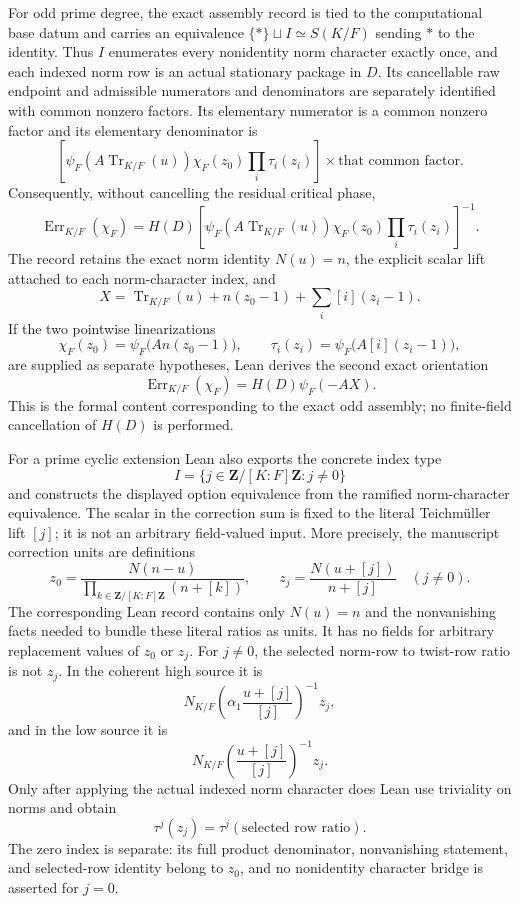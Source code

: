 \begin{definition}
For odd prime degree, the exact assembly record is tied to the computational
base datum and carries an equivalence
$\{\ast\}\sqcup I\simeq S(K/F)$ sending $\ast$ to the identity.  Thus $I$
enumerates every nonidentity norm character exactly once, and each indexed
norm row is an actual stationary package in $D$.  Its cancellable raw
endpoint and admissible numerators and denominators are separately identified
with common nonzero factors.  Its elementary numerator is a common nonzero
factor and its elementary denominator is
\[
 \left[
  \psi_F\!\left(A\operatorname{Tr}_{K/F}(u)\right)
  \chi_F(z_0)\prod_i\tau_i(z_i)
 \right]
 \times\text{that common factor}.
\]
Consequently, without cancelling the residual critical phase,
\[
 \operatorname{Err}_{K/F}(\chi_F)
 =H(D)
 \left[
  \psi_F\!\left(A\operatorname{Tr}_{K/F}(u)\right)
  \chi_F(z_0)\prod_i\tau_i(z_i)
 \right]^{-1}.
\]
The record retains the exact norm identity $N(u)=n$, the explicit scalar
lift attached to each norm-character index, and
\[
 X=\operatorname{Tr}_{K/F}(u)+n(z_0-1)
      +\sum_i [i](z_i-1).
\]
If the two pointwise linearizations
\[
 \chi_F(z_0)=\psi_F\bigl(An(z_0-1)\bigr),
 \qquad
 \tau_i(z_i)=\psi_F\bigl(A[i](z_i-1)\bigr),
\]
are supplied as separate hypotheses, Lean derives the second exact
orientation
\[
 \operatorname{Err}_{K/F}(\chi_F)=H(D)\psi_F(-AX).
\]
This is the formal content corresponding to the exact odd assembly; no
finite-field cancellation of $H(D)$ is performed.

For a prime cyclic extension Lean also exports the concrete index type
\[
 I=\{j\in\mathbf Z/[K:F]\mathbf Z:j\ne0\}
\]
and constructs the displayed option equivalence from the ramified
norm-character equivalence.  The scalar in the correction sum is fixed to
the literal Teichm\"uller lift $[j]$; it is not an arbitrary field-valued
input.  More precisely, the manuscript correction units are definitions
\[
 z_0=\frac{N(n-u)}{\prod_{k\in\mathbf Z/[K:F]\mathbf Z}(n+[k])},
 \qquad
 z_j=\frac{N(u+[j])}{n+[j]}\quad(j\ne0).
\]
The corresponding Lean record contains only $N(u)=n$ and the nonvanishing
facts needed to bundle these literal ratios as units.  It has no fields for
arbitrary replacement values of $z_0$ or $z_j$.  For $j\ne0$, the selected
norm-row to twist-row ratio is not $z_j$.  In the coherent high source it is
\[
 N_{K/F}\!\left(\alpha_1\frac{u+[j]}{[j]}\right)^{-1}z_j,
\]
and in the low source it is
\[
 N_{K/F}\!\left(\frac{u+[j]}{[j]}\right)^{-1}z_j.
\]
Only after applying the actual indexed norm character does Lean use
triviality on norms and obtain
\[
 \tau^j(z_j)=\tau^j(\text{selected row ratio}).
\]
The zero index is separate: its full product denominator, nonvanishing
statement, and selected-row identity belong to $z_0$, and no nonidentity
character bridge is asserted for $j=0$.


\end{definition}
